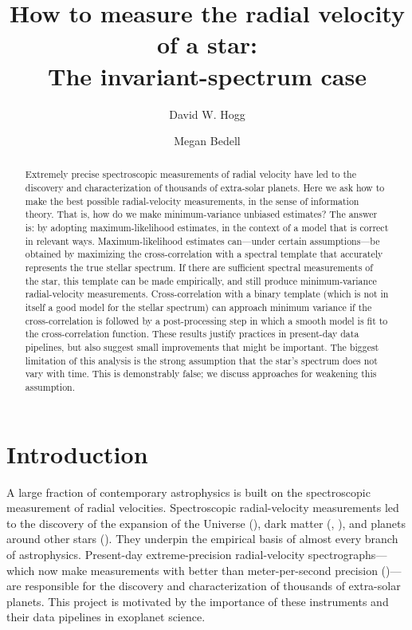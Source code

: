 \documentclass[modern]{aastex631}
\begin{document}
\title{How to measure the radial velocity of a star:\\The invariant-spectrum case}
\author[0000-0003-2866-9403]{David W. Hogg}

\author[0000-0001-9907-7742]{Megan Bedell}

\begin{abstract}\noindent
    Extremely precise spectroscopic measurements of radial velocity have led to the discovery and characterization of thousands of extra-solar planets.
    Here we ask how to make the best possible radial-velocity measurements, in the sense of information theory.
    That is, how do we make minimum-variance unbiased estimates?
    The answer is: by adopting maximum-likelihood estimates, in the context of a model that is correct in relevant ways.
    Maximum-likelihood estimates can---under certain assumptions---be obtained by maximizing the cross-correlation with a spectral template that accurately represents the true stellar spectrum.
    If there are sufficient spectral measurements of the star, this template can be made empirically, and still produce minimum-variance radial-velocity measurements.
    Cross-correlation with a binary template (which is not in itself a good model for the stellar spectrum) can approach minimum variance if the cross-correlation is followed by a post-processing step in which a smooth model is fit to the cross-correlation function.
    These results justify practices in present-day data pipelines, but also suggest small improvements that might be important.
    The biggest limitation of this analysis is the strong assumption that the star's spectrum does not vary with time.
    This is demonstrably false; we discuss approaches for weakening this assumption.
\end{abstract}


\section{Introduction}\label{sec:intro}

A large fraction of contemporary astrophysics is built on the spectroscopic measurement of radial velocities.
Spectroscopic radial-velocity measurements led to the discovery of the expansion of the Universe (\citealt{hubble}),
dark matter (\citealt{zwicky}, \citealt{rubin}),
and planets around other stars (\citealt{queloz}).
They underpin the empirical basis of almost every branch of astrophysics.
Present-day extreme-precision radial-velocity spectrographs---which now make measurements with better than meter-per-second precision (\citealt{what?})---are responsible for the discovery and characterization of thousands of extra-solar planets.
This project is motivated by the importance of these instruments and their data pipelines in exoplanet science.
\end{document}
